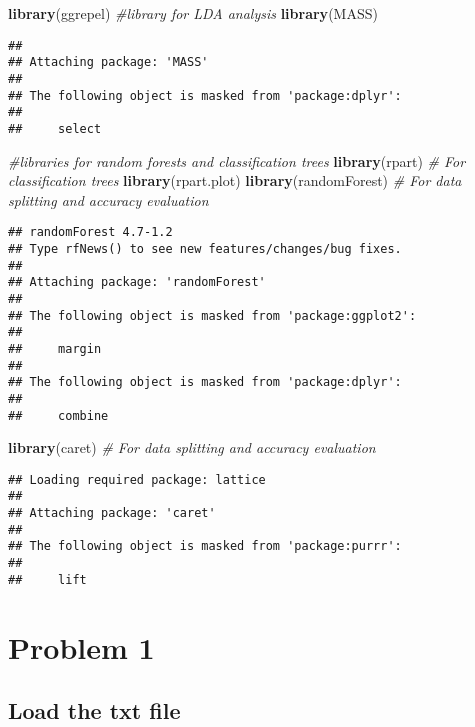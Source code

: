 \documentclass[
]{article}
\newenvironment{Shaded}{\begin{snugshade}}{\end{snugshade}}
\newcommand{\CommentTok}[1]{\textcolor[rgb]{0.56,0.35,0.01}{\textit{#1}}}
\newcommand{\FunctionTok}[1]{\textcolor[rgb]{0.13,0.29,0.53}{\textbf{#1}}}
\newcommand{\NormalTok}[1]{#1}
\begin{document}
\begin{Shaded}
\begin{Highlighting}[]
\FunctionTok{library}\NormalTok{(ggrepel)}
\CommentTok{\#library for LDA analysis}
\FunctionTok{library}\NormalTok{(MASS)}
\end{Highlighting}
\end{Shaded}

\begin{verbatim}
## 
## Attaching package: 'MASS'
## 
## The following object is masked from 'package:dplyr':
## 
##     select
\end{verbatim}

\begin{Shaded}
\begin{Highlighting}[]
\CommentTok{\#libraries for random forests and classification trees}
\FunctionTok{library}\NormalTok{(rpart)        }\CommentTok{\# For classification trees}
\FunctionTok{library}\NormalTok{(rpart.plot)}
\FunctionTok{library}\NormalTok{(randomForest)       }\CommentTok{\# For data splitting and accuracy evaluation}
\end{Highlighting}
\end{Shaded}

\begin{verbatim}
## randomForest 4.7-1.2
## Type rfNews() to see new features/changes/bug fixes.
## 
## Attaching package: 'randomForest'
## 
## The following object is masked from 'package:ggplot2':
## 
##     margin
## 
## The following object is masked from 'package:dplyr':
## 
##     combine
\end{verbatim}

\begin{Shaded}
\begin{Highlighting}[]
\FunctionTok{library}\NormalTok{(caret)        }\CommentTok{\# For data splitting and accuracy evaluation}
\end{Highlighting}
\end{Shaded}

\begin{verbatim}
## Loading required package: lattice
## 
## Attaching package: 'caret'
## 
## The following object is masked from 'package:purrr':
## 
##     lift
\end{verbatim}

\section{Problem 1}\label{problem-1}

\subsection{Load the txt file}\label{load-the-txt-file}
\end{document}
